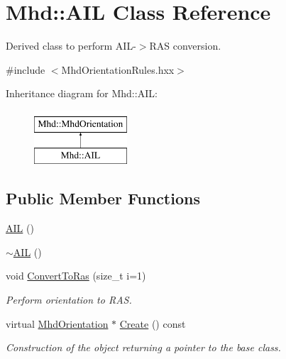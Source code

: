 \hypertarget{classMhd_1_1AIL}{\section{\-Mhd\-:\-:\-A\-I\-L \-Class \-Reference}
\label{classMhd_1_1AIL}
}


\-Derived class to perform \-A\-I\-L-\/$>$\-R\-A\-S conversion.  




{\ttfamily \#include $<$\-Mhd\-Orientation\-Rules.\-hxx$>$}

\-Inheritance diagram for \-Mhd\-:\-:\-A\-I\-L\-:\begin{figure}[H]
\begin{center}
\leavevmode
\includegraphics[height=2.000000cm]{classMhd_1_1AIL}
\end{center}
\end{figure}
\subsection*{\-Public \-Member \-Functions}
\begin{DoxyCompactItemize}
\item 
\hyperlink{classMhd_1_1AIL_ab594a6c8e7b1fc32af9883388cccf394}{\-A\-I\-L} ()
\item 
\hyperlink{classMhd_1_1AIL_a08ac931930c8577e4aa2f254bf4f653b}{$\sim$\-A\-I\-L} ()
\item 
void \hyperlink{classMhd_1_1AIL_af6fda476c21c720db99d399163ee5f3b}{\-Convert\-To\-Ras} (size\-\_\-t i=1)
\begin{DoxyCompactList}\small\item\em \-Perform orientation to \-R\-A\-S. \end{DoxyCompactList}\item 
virtual \hyperlink{classMhd_1_1MhdOrientation}{\-Mhd\-Orientation} $\ast$ \hyperlink{classMhd_1_1AIL_a5024cf0a7ac9b469436a070db45642be}{\-Create} () const 
\begin{DoxyCompactList}\small\item\em \-Construction of the object returning a pointer to the base class. \end{DoxyCompactList}\end{DoxyCompactItemize}


